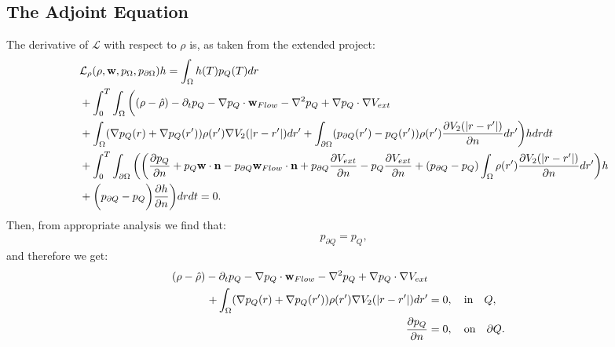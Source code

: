 \documentclass[11pt, a4paper]{article}
\newcommand{\Adja}{{p}_Q}
\newcommand{\Adjc}{p_{\partial Q}}
\theoremstyle{definition}
\begin{document}
\subsection*{The Adjoint Equation}
The derivative of $\mathcal{L}$ with respect to $\rho$ is, as taken from the extended project:
\begin{align*}
&\mathcal{L}_\rho (\rho,\mathbf{w},p_\Omega,p_{\partial \Omega})h=
\int_\Omega h(T) \Adja(T) dr\\
&+ \int_0^T \int_\Omega \bigg( (\rho- \hat{\rho})   - \partial_t \Adja  - \nabla \Adja \cdot \mathbf{w}_{Flow}  - \nabla^2 \Adja \notag 
+  \nabla \Adja \cdot \nabla V_{ext}  \notag \\
&+ \int_\Omega (\nabla  \Adja(r)+\nabla  \Adja(r')) \rho(r') \nabla V_2(|r-r'|) dr'+ \int_{\partial \Omega} ( \Adjc(r') - \Adja(r')) \rho(r')   \frac{\partial V_2(|r-r'|)}{\partial n} dr' \bigg) h dr dt \\
&+  \int_0^T\int_{\partial \Omega}  \bigg(
\bigg(\frac{\partial \Adja }{\partial n} + \Adja  \mathbf{w} \cdot \mathbf{n} - \Adjc \mathbf{w}_{Flow} \cdot \mathbf{n}  +  \Adjc \dfrac{\partial V_{ext}}{\partial n} - \Adja \frac{\partial V_{ext}}{\partial n} + ( \Adjc - \Adja)  \int_\Omega \rho(r') \frac{\partial V_2(|r-r'|)}{\partial n} dr'\bigg)h \notag\\
&+ \bigg( \Adjc- \Adja \bigg) \frac{\partial h}{\partial n} \bigg) dr dt =0.
\end{align*}
Then, from appropriate analysis we find that:
\begin{align*}
\Adjc = \Adja,
\end{align*}
and therefore we get:
\begin{align*}
 (\rho- \hat{\rho})   - \partial_t  \Adja  - \nabla \Adja \cdot \mathbf{w}_{Flow}  - \nabla^2 \Adja \notag 
+  \nabla \Adja \cdot \nabla V_{ext}  \notag \\
+ \int_\Omega (\nabla  \Adja(r)+\nabla  \Adja(r')) \rho(r') \nabla V_2(|r-r'|) dr' &=0, \quad \text{in} \quad Q, \\
\frac{\partial \Adja }{\partial n}&=0, \quad \text{on} \quad \partial Q.
\end{align*}
\end{document}
